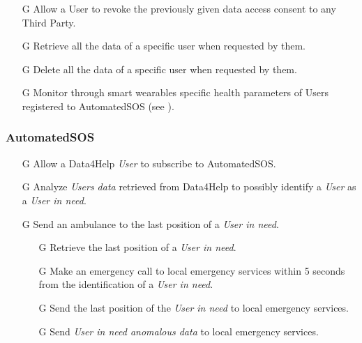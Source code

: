 \documentclass[../../rasd.tex]{subfiles}
\begin{document}
\begin{itemize}
						\item[G\subs{8}]Allow a User to revoke the previously given data access consent to any Third Party.
						\item[G\subs{9}]Retrieve all the data of a specific user when requested by them.
						\item[G\subs{10}]Delete all the data of a specific user when requested by them.

						\item[G\subs{11}]Monitor through smart wearables specific health parameters of Users registered to AutomatedSOS (see ).
					\end{itemize}



				\subsubsection{AutomatedSOS}
					\begin{itemize}
						\item[G\subs{12}]Allow a Data4Help \textit{User} to subscribe to AutomatedSOS.

						\item[G\subs{13}]Analyze \textit{Users data} retrieved from Data4Help to possibly identify a \textit{User} as a \textit{User in need}. 

						\item[G\subs{14}]Send an ambulance to the last position of a \textit{User in need}.
							\begin{itemize}
								\item[G\subs{14.1}]Retrieve the last position of a \textit{User in need}.
								\item[G\subs{14.2}]Make an emergency call to local emergency services within 5 seconds from the identification of a \textit{User in need}.
								\item[G\subs{14.3}]Send the last position of the \textit{User in need} to local emergency services.
								\item[G\subs{14.4}]Send \textit{User in need anomalous data} to local emergency services.
							\end{itemize}
					\end{itemize}
\end{document}
